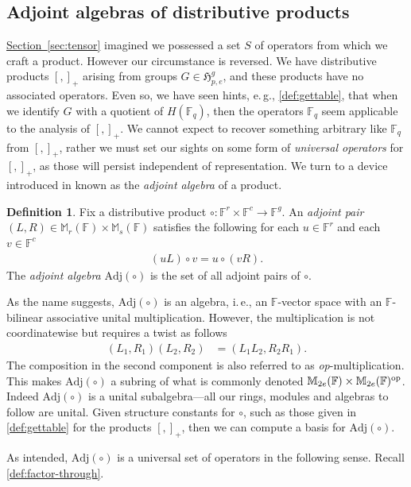 \documentclass[11pt]{article}
\numberwithin{equation}{section}
\theoremstyle{definition}
\theoremstyle{plain}
\newcommand{\ie}{i.\,e.}
\newcommand{\eg}{e.\,g.}
\newcommand{\expref}[2]{\hyperref[#2]{#1~\ref{#2}}}
\numberwithin{equation}{section}
\theoremstyle{plain}       %
\theoremstyle{remark}
\theoremstyle{definition}
\newtheorem{defn}[equation]{Definition}
\numberwithin{figure}{section}
\numberwithin{table}{section}
\newcommand{\mygroups}{\mathfrak{H}}
\newcommand{\bbF}{\mathbb{F}}  %
\begin{document}
\subsection{Adjoint algebras of distributive products}\label{sec:adjoint}
\expref{Section}{sec:tensor} imagined we possessed a set $S$ of operators from which
we craft a product.  However our circumstance is reversed.  We have distributive
products $[,]_+$ arising from  groups $G\in\mygroups_{p,e}^g$, and these
products have no associated operators.  Even so, we have seen hints, \eg,
\eqref{def:gettable}, that when we identify  $G$ with a quotient of $H(\bbF_q)$,
then the operators $\bbF_q$ seem applicable to the analysis of $[,]_+$.  We
cannot expect to recover something arbitrary like $\bbF_q$ from $[,]_+$, rather
we must set our sights on some form of \emph{universal operators} for $[,]_+$,
as those will persist independent of representation.  We turn to a device
introduced in \cite{Wilson:unique-cent} known as the \emph{adjoint algebra} of a
product.

\begin{defn}
	Fix a distributive product $\circ:\bbF^r\times \bbF^c\to \bbF^g$.  An
	\emph{adjoint pair} $(L,R)\in \mathbb{M}_r(\bbF)\times\mathbb{M}_s(\bbF)$
	satisfies the following for each $u\in \bbF^r$ and each $v\in \bbF^c$
	\begin{align*}
		(uL)\circ v=u\circ (vR).
	\end{align*}
	The \emph{adjoint algebra} $\mathrm{Adj}(\circ)$ is the set of all adjoint
	pairs of $\circ$.
\end{defn}

As the name suggests, $\mathrm{Adj}(\circ)$ is an algebra, \ie, an $\bbF$-vector
space with an $\bbF$-bilinear associative unital multiplication.  However, the
multiplication is not coordinatewise but requires a twist as follows
\begin{align}
	(L_1,R_1)(L_2,R_2) &= (L_1L_2,R_2R_1).
\end{align}
The composition in the second component is also referred to as
\emph{op}-multiplication.  This makes $\mathrm{Adj}(\circ)$ a subring of what is
commonly denoted $\mathbb{M}_{2e}(\bbF)\times \mathbb{M}_{2e}(\bbF)^{\rm op}$.
Indeed $\mathrm{Adj}(\circ)$ is a unital subalgebra---all our rings, modules
and algebras to follow are unital.  Given structure constants for $\circ$, such
as those given in \eqref{def:gettable} for the products $[,]_+$, then we can
compute a basis for $\mathrm{Adj}(\circ)$.

As intended, $\mathrm{Adj}(\circ)$ is a universal set of operators in the
following sense.  Recall \eqref{def:factor-through}.
\end{document}
